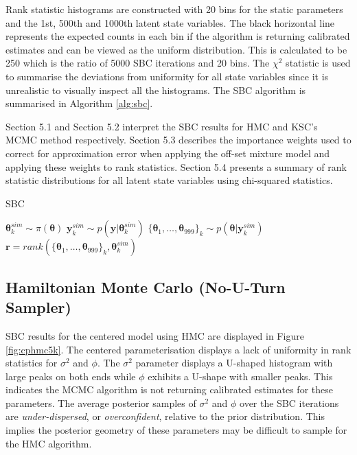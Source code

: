 \documentclass[12pt, a4paper]{article}
\begin{document}
    Rank statistic histograms are constructed with 20 bins for the static parameters and the 1st, 500th and 1000th latent state variables. The black horizontal line represents the expected counts in each bin if the algorithm is returning calibrated estimates and can be viewed as the uniform distribution. This is calculated to be 250 which is the ratio of  5000 SBC iterations and 20 bins. The $\chi^2$ statistic is used to summarise the deviations from uniformity for all state variables since it is unrealistic to visually inspect all the histograms. The SBC algorithm is summarised in Algorithm \ref{alg:sbc}.

    Section 5.1 and Section 5.2 interpret the SBC results for HMC and KSC's MCMC method respectively. Section 5.3 describes the importance weights used to correct for approximation error when applying the off-set mixture model and applying these weights to rank statistics. Section 5.4 presents a summary of rank statistic distributions for all latent state variables using chi-squared statistics.
    
    \begin{algorithm}
        \caption{SBC}\label{alg:sbc}
        \begin{algorithmic}
                \State {} $\boldsymbol{\theta}^{sim}_k \sim\pi (\boldsymbol{\theta})$
                \State {} $\boldsymbol{y}^{sim}_k \sim p(\boldsymbol{y}|\boldsymbol{\theta}^{sim}_k)$
                \State {} $\{\boldsymbol{\theta}_1,\dots , \boldsymbol{\theta}_{999}\}_k \sim p(\boldsymbol{\theta} | \boldsymbol{y}^{sim}_k)$
                \State {} $\boldsymbol{r} = rank(\{\boldsymbol{\theta}_1,\dots , \boldsymbol{\theta}_{999}\}_k, \boldsymbol{\theta}^{sim}_k)$
              \EndFor
        \end{algorithmic}
        \end{algorithm}
        
    \subsection{Hamiltonian Monte Carlo (No-U-Turn Sampler)}
    SBC results for the centered model using HMC are displayed in Figure \ref{fig:cphmc5k}. The centered parameterisation displays a lack of uniformity in rank statistics for $\sigma^2$ and $\phi$. The $\sigma^2$ parameter displays a U-shaped histogram with large peaks on both ends while $\phi$ exhibits a U-shape with smaller peaks. This indicates the MCMC algorithm is not returning calibrated estimates for these parameters. The average posterior samples of $\sigma^2$ and $\phi$ over the SBC iterations are \textit{under-dispersed}, or \textit{overconfident}, relative to the prior distribution. This implies the posterior geometry of these parameters may be difficult to sample for the HMC algorithm.
\end{document}
